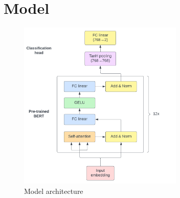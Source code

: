 \section{Model}
\label{sec:model}

\begin{figure}
    \centering
    \includegraphics[width=0.7\textwidth]{figs/model_architecture.png}
    \caption{Model architecture}
    \label{fig:model-architecture}
\end{figure}

